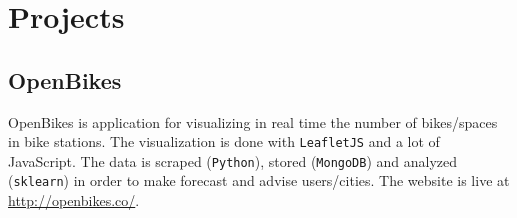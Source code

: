 \section{Projects}

\subsection{OpenBikes}
\noindent
\begin{minipage}{.15\textwidth}
\end{minipage}%
\hspace{5mm}
\begin{minipage}{.8\textwidth}
\raggedright
OpenBikes is application for visualizing in real time the number of bikes/spaces in bike stations. The visualization is done with \texttt{LeafletJS} and a lot of JavaScript. The data is scraped (\texttt{Python}), stored (\texttt{MongoDB}) and analyzed (\texttt{sklearn}) in order to make forecast and advise users/cities. The website is live at \textcolor{cyan}{\url{http://openbikes.co/}}.
\end{minipage}
